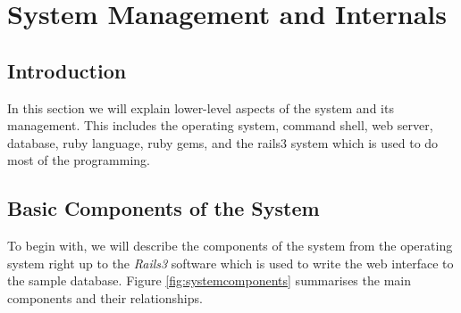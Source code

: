 \documentclass[12pt,twoside]{article}
\begin{document}
\section{System Management and Internals}
\subsection{Introduction}
In this section we will explain lower-level aspects of the system
and its management.
This includes the operating system, command shell, web server, 
database, ruby language, ruby gems, and the rails3 system which is
used to do most of the programming.

\subsection{Basic Components of the System}
To begin with, we will describe the components of the system from the
operating system right up to the \emph{Rails3} software which is used
to write the web interface to the sample database.
Figure \ref{fig:systemcomponents} summarises the main components and
their relationships.
\end{document}

